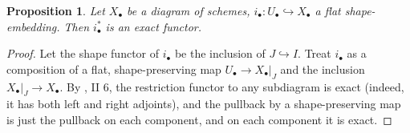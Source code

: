 \documentclass[proquest]{uwthesis}[2014/11/13]
\newtheorem{prop}[theorem]{Proposition}
\theoremstyle{definition}
\begin{document}
\begin{prop}
	Let $X_\bullet$ be a diagram of schemes, $i_\bullet : U_\bullet \hookrightarrow X_\bullet$ a flat shape-embedding.
	Then $i_\bullet^*$ is an exact functor.
\end{prop}
\begin{proof}
	Let the shape functor of $i_\bullet$ be the inclusion of $J \hookrightarrow I$.
	Treat $i_\bullet$ as a composition of a flat, shape-preserving map $U_\bullet \rightarrow X_\bullet|_J$ and the inclusion $X_\bullet|_J \rightarrow X_\bullet$.
	By \cite{Lipman2009}, II 6, the restriction functor to any subdiagram is exact (indeed, it has both left and right adjoints), and the pullback by a shape-preserving map is just the pullback on each component, and on each component it is exact.
\end{proof}
\end{document}
